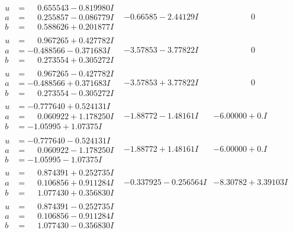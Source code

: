 \documentclass[1p]{elsarticle_modified}
\theoremstyle{definition}
\begin{document}
$$\begin{array}{c|c|c}
\begin{aligned}
u &= \phantom{-}0.655543 - 0.819980 I \\
a &= \phantom{-}0.255857 - 0.086779 I \\
b &= \phantom{-}0.588626 + 0.201877 I\end{aligned}
 & -0.66585 - 2.44129 I & \phantom{-0.000000 } 0 \\ \hline\begin{aligned}
u &= \phantom{-}0.967265 + 0.427782 I \\
a &= -0.488566 - 0.371683 I \\
b &= \phantom{-}0.273554 + 0.305272 I\end{aligned}
 & -3.57853 - 3.77822 I & \phantom{-0.000000 } 0 \\ \hline\begin{aligned}
u &= \phantom{-}0.967265 - 0.427782 I \\
a &= -0.488566 + 0.371683 I \\
b &= \phantom{-}0.273554 - 0.305272 I\end{aligned}
 & -3.57853 + 3.77822 I & \phantom{-0.000000 } 0 \\ \hline\begin{aligned}
u &= -0.777640 + 0.524131 I \\
a &= \phantom{-}0.060922 + 1.178250 I \\
b &= -1.05995 + 1.07375 I\end{aligned}
 & -1.88772 - 1.48161 I & -6.00000 + 0. I\phantom{ +0.000000I} \\ \hline\begin{aligned}
u &= -0.777640 - 0.524131 I \\
a &= \phantom{-}0.060922 - 1.178250 I \\
b &= -1.05995 - 1.07375 I\end{aligned}
 & -1.88772 + 1.48161 I & -6.00000 + 0. I\phantom{ +0.000000I} \\ \hline\begin{aligned}
u &= \phantom{-}0.874391 + 0.252735 I \\
a &= \phantom{-}0.106856 + 0.911284 I \\
b &= \phantom{-}1.077430 + 0.356830 I\end{aligned}
 & -0.337925 - 0.256564 I & -8.30782 + 3.39103 I \\ \hline\begin{aligned}
u &= \phantom{-}0.874391 - 0.252735 I \\
a &= \phantom{-}0.106856 - 0.911284 I \\
b &= \phantom{-}1.077430 - 0.356830 I\end{aligned}

\end{array}$$
\end{document}
